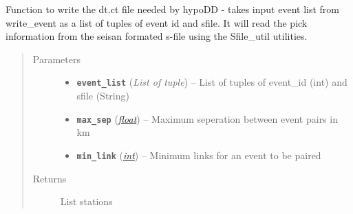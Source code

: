 \documentclass[a4paper,10pt,english]{sphinxmanual}
\begin{document}

\begin{fulllineitems}
\label{utils:catalogue2DD.write_catalogue}
Function to write the dt.ct file needed by hypoDD - takes input event list
from write\_event as a list of tuples of event id and sfile.  It will read
the pick information from the seisan formated s-file using the Sfile\_util
utilities.
\begin{quote}\begin{description}
\item[{Parameters}] \leavevmode\begin{itemize}
\item {} 
\textbf{\texttt{event\_list}} (\emph{List of tuple}) -- List of tuples of event\_id (int) and sfile (String)

\item {} 
\textbf{\texttt{max\_sep}} (\href{https://docs.python.org/library/functions.html\#float}{\emph{float}}) -- Maximum seperation between event pairs in km

\item {} 
\textbf{\texttt{min\_link}} (\href{https://docs.python.org/library/functions.html\#int}{\emph{int}}) -- Minimum links for an event to be paired

\end{itemize}

\item[{Returns}] \leavevmode
List stations

\end{description}\end{quote}

\end{fulllineitems}

\end{document}
